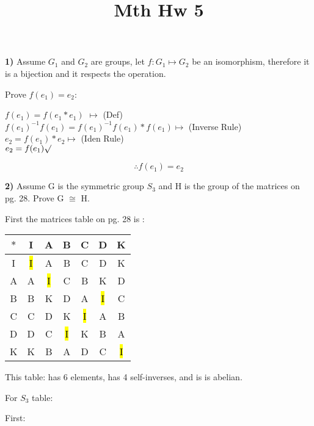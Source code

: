 \documentclass{article}
\title{Mth Hw 5}
\date{}
\begin{document}
\maketitle

\textbf{1)} Assume $G_1$ and $G_2$ are groups, let $f: G_1 \mapsto  G_2 $ be an isomorphism, therefore it is a bijection and it respects  the operation. 

\medskip


Prove $f(e_1)=e_2$: 


\begin{center} 
$f(e_1)=f(e_1*e_1)$ 		$\mapsto$ (Def) \\

\medskip
$f(e_1)^{-1}f(e_1)=f(e_1)^{-1}f(e_1)*f(e_1)		\mapsto$ (Inverse Rule) \\

\medskip
$e_2=f(e_1)*e_2		\mapsto$ (Iden Rule) \\

\medskip
$e_2=f(e_1) 		 \surd$
\end{center} 

$$\therefore f(e_1)=e_2$$

\bigskip
\newpage
\textbf{2)} Assume G is the symmetric group $S_3$ and H is the group of the matrices on pg. 28.
Prove G $\cong$ H. 

\medskip
First the matrices table on pg. 28 is :

\begin{table}[ht]
	\begin{tabular}{|c| |c| |c| |c| |c| |c| |c|}		
	\hline
	$ *$ & I & A & B & C & D & K \\
	\hline
	I & \hl{I} & A & B & C & D & K \\
	\hline
	A & A &\hl{I} & C & B & K & D \\
	\hline
	B& B & K  & D & A & \hl{I} & C \\
	\hline
	C& C & D  & K & \hl{I} & A & B \\
	\hline
 	D& D & C  & \hl{I} & K & B & A \\
	\hline
	K& K & B  & A & D & C & \hl{I}
	\end{tabular}
\end{table} \hspace{.01in} This table: has 6 elements,  has 4 self-inverses, and is is abelian.

\medskip


For $S_3$ table:

First:
\end{document}
